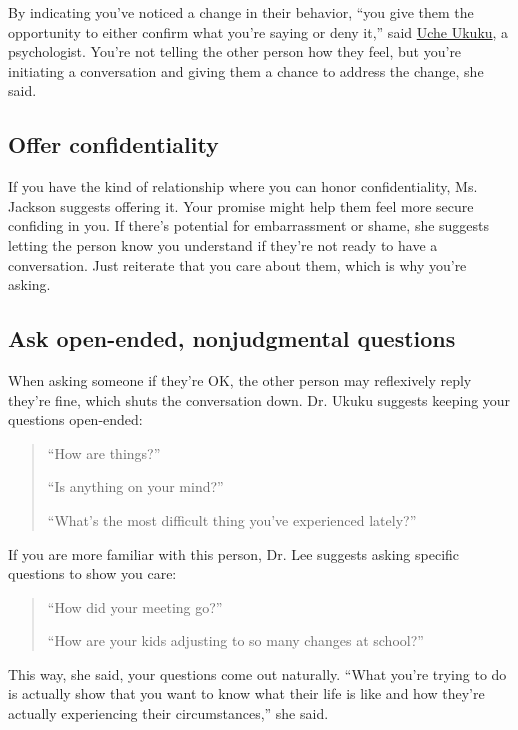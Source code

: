 By indicating you've noticed a change in their behavior, ``you give them
the opportunity to either confirm what you're saying or deny it,'' said
\href{https://www.drukuku.com/}{Uche Ukuku}, a psychologist. You're not
telling the other person how they feel, but you're initiating a
conversation and giving them a chance to address the change, she said.

\hypertarget{offer-confidentiality}{%
\subsection{Offer confidentiality}\label{offer-confidentiality}}

If you have the kind of relationship where you can honor
confidentiality, Ms. Jackson suggests offering it. Your promise might
help them feel more secure confiding in you. If there's potential for
embarrassment or shame, she suggests letting the person know you
understand if they're not ready to have a conversation. Just reiterate
that you care about them, which is why you're asking.

\hypertarget{ask-open-ended-nonjudgmental-questions}{%
\subsection{Ask open-ended, nonjudgmental
questions}\label{ask-open-ended-nonjudgmental-questions}}

When asking someone if they're OK, the other person may reflexively
reply they're fine, which shuts the conversation down. Dr. Ukuku
suggests keeping your questions open-ended:

\begin{quote}
``How are things?''

``Is anything on your mind?''

``What's the most difficult thing you've experienced lately?''
\end{quote}

If you are more familiar with this person, Dr. Lee suggests asking
specific questions to show you care:

\begin{quote}
``How did your meeting go?''

``How are your kids adjusting to so many changes at school?''
\end{quote}

This way, she said, your questions come out naturally. ``What you're
trying to do is actually show that you want to know what their life is
like and how they're actually experiencing their circumstances,'' she
said.

